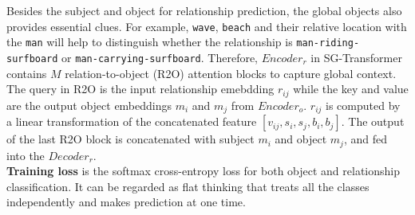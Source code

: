 \documentclass{article}
\begin{document}
Besides the subject and object for relationship prediction, the global objects also provides essential clues. For example,  \texttt{wave}, \texttt{beach} and their relative location with the \texttt{man} will help to distinguish whether the relationship is \texttt{man}\texttt{-riding}\texttt{-surfboard} or \texttt{man}\texttt{-carrying}\texttt{-surfboard}. Therefore, $Encoder_r$ in SG-Transformer contains $M$ relation-to-object (R2O) attention blocks to capture global context. The query in R2O is the input relationship emebdding $r_{ij}$ while the key and value are the output object embeddings $m_i$ and $m_j$ from $Encoder_o$. $r_{ij}$ is computed by a linear transformation of the concatenated feature $[v_{ij},s_i,s_j,b_i,b_j]$. The output of the last R2O block is concatenated with subject $m_i$ and object $m_j$, and fed into the $Decoder_r$. \\
\textbf{Training loss} is the softmax cross-entropy loss \cite{zellers2018neural} for both object and relationship classification. It can be regarded as  flat thinking that treats all the classes independently and makes prediction at one time. 
\fi
\end{document}
